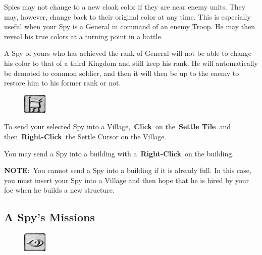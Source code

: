 Spies may not change to a new cloak color if they are near enemy units. They may, however, change back to their original color at any time. This is especially useful when your Spy is a General in command of an enemy Troop. He may then reveal his true colors at a turning point in a battle.

A Spy of yours who has achieved the rank of General will not be able to change his color to that of a third Kingdom and still keep his rank. He will automatically be demoted to common soldier, and then it will then be up to the enemy to restore him to his former rank or not.

\begin{figure}
	\vspace{-20pt}
	\begin{center}
		\includegraphics[width=0.1\textwidth]{Tsettle}
	\end{center}
	\vspace{-20pt}
\end{figure}

To send your selected Spy into a Village, \textbf{Click} on the \textbf{Settle Tile} and then \textbf{Right-Click} the Settle Cursor on the Village.

You may send a Spy into a building with a \textbf{Right-Click} on the building.

\textbf{NOTE}: You cannot send a Spy into a building if it is already full. In this case, you must insert your Spy into a Village and then hope that he is hired by your foe when he builds a new structure.

\subsection{A Spy’s Missions}

\begin{figure}
	\vspace{-20pt}
	\begin{center}
		\includegraphics[width=0.1\textwidth]{Tspy}
	\end{center}
	\vspace{-20pt}
\end{figure}

